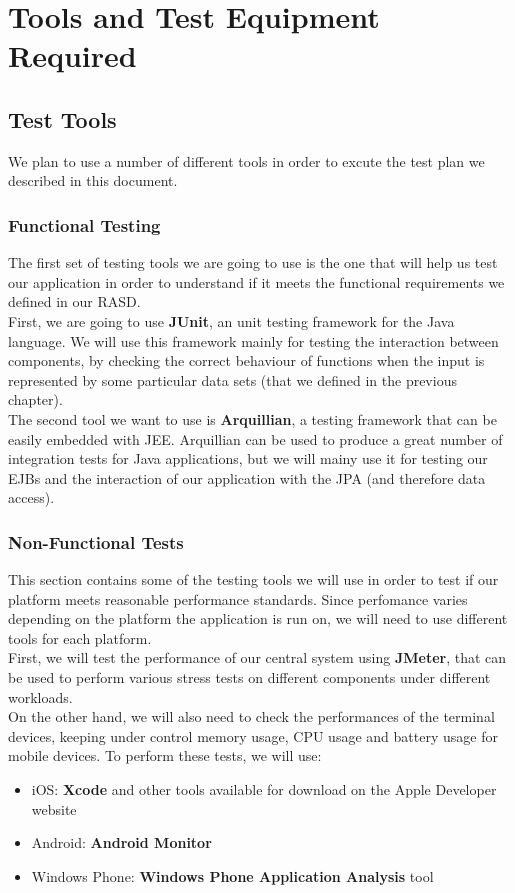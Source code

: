 \documentclass{article}
\begin{document}
\newpage

\section{Tools and Test Equipment Required}
\subsection{Test Tools}
We plan to use a number of different tools in order to excute the test plan we described in this document.
\subsubsection{Functional Testing}
The first set of testing tools we are going to use is the one that will help us test our application in order to understand  if it meets the functional requirements we defined in our RASD.
\\

First, we are going to use \textbf{JUnit}, an unit testing framework for the Java language. We will use this framework mainly for testing the interaction between components, by checking the correct behaviour of functions when the input is represented by some particular data sets (that we defined in the previous chapter).
\\

The second tool we want to use is \textbf{Arquillian}, a testing framework that can be easily embedded with JEE. Arquillian can be used to produce a great number of integration tests for Java applications, but we will mainy use it for testing our EJBs and the interaction of our application with the JPA (and therefore data access).
\subsubsection{Non-Functional Tests}
This section contains some of the testing tools we will use in order to test if our platform meets reasonable performance standards. Since perfomance varies depending on the platform the application is run on, we will need to use different tools for each platform.\\
First, we will test the performance of our central system using \textbf{JMeter}, that can be used to perform various stress tests on different components under different workloads.\\
On the other hand, we will also need to check the performances of the terminal devices, keeping under control memory usage, CPU usage and battery usage for mobile devices. To perform these tests, we will use:
\begin{itemize}[noitemsep]
\item iOS: \textbf{Xcode} and other tools available for download on the Apple Developer website
\item Android:\textbf{ Android Monitor}
\item Windows Phone: \textbf{Windows Phone Application Analysis} tool
\end{itemize}
\newpage 
\end{document}
